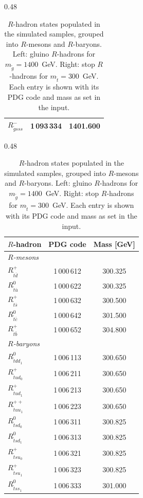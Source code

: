 \begin{table}[h]
\begin{subtable}[t]{0.48\textwidth}
\begin{tabular}{lcc}
        $R^-_{\tilde{g}sss}$    & 1\,093\,334 & 1401.600 \\
        \bottomrule
        \end{tabular}
        \end{subtable}
        \hfill
        \begin{subtable}[t]{0.48\textwidth}
        \centering
        \caption{Stop $R$-hadrons}
        \label{tab:rhadrons_stop}
        \renewcommand{\arraystretch}{1.15}
        \begin{tabular}{lcc}
        \toprule
        $R$-hadron & PDG code & Mass [GeV] \\
        \midrule
        \multicolumn{3}{l}{\textit{$R$-mesons}} \\[0.15em]
        $R^+_{\tilde{t} \bar{d}}$ & 1\,000\,612 & 300.325 \\
        $R^0_{\tilde{t} \bar{u}}$ & 1\,000\,622 & 300.325 \\
        $R^+_{\tilde{t} \bar{s}}$ & 1\,000\,632 & 300.500 \\
        $R^0_{\tilde{t} \bar{c}}$ & 1\,000\,642 & 301.500 \\
        $R^+_{\tilde{t} \bar{b}}$ & 1\,000\,652 & 304.800 \\
        \midrule
        \multicolumn{3}{l}{\textit{$R$-baryons}} \\[0.15em]
        $R^0_{\tilde{t} dd_1}$    & 1\,006\,113 & 300.650 \\
        $R^+_{\tilde{t} ud_0}$    & 1\,006\,211 & 300.650 \\
        $R^+_{\tilde{t} ud_1}$    & 1\,006\,213 & 300.650 \\
        $R^{++}_{\tilde{t} uu_1}$ & 1\,006\,223 & 300.650 \\
        $R^0_{\tilde{t} sd_0}$    & 1\,006\,311 & 300.825 \\
        $R^0_{\tilde{t} sd_1}$    & 1\,006\,313 & 300.825 \\
        $R^+_{\tilde{t} su_0}$    & 1\,006\,321 & 300.825 \\
        $R^+_{\tilde{t} su_1}$    & 1\,006\,323 & 300.825 \\
        $R^0_{\tilde{t} ss_1}$    & 1\,006\,333 & 301.000 \\
        \bottomrule
        \end{tabular}
    \end{subtable}
    \caption{$R$-hadron states populated in the simulated samples, grouped into $R$-mesons and $R$-baryons. Left: gluino $R$-hadrons for $m_{\tilde{g}} = 1400$~GeV. Right: stop $R$-hadrons for $m_{\tilde{t}} = 300$~GeV. Each entry is shown with its PDG code and mass as set in the input.}
    \label{tab:Rhadron_composite}
\end{table}

